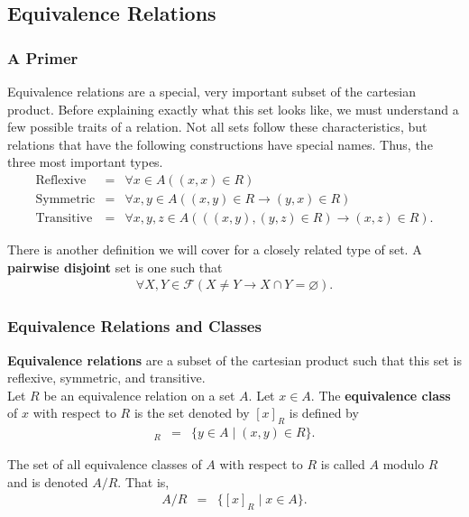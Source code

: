 \documentclass{article}
\begin{document}
\subsection{Equivalence Relations}
\subsubsection{A Primer}
Equivalence relations are a special, very important subset of the cartesian product. Before explaining exactly what this set looks like, we 
must understand a few possible traits of a relation. Not all sets follow these characteristics, but relations that have the following constructions
have special names. Thus, the three most important types.
\begin{eqnarray*}
    \text{Reflexive} &=& \forall x \in A ((x,x) \in R) \\
    \text{Symmetric} &=&  \forall x,y \in A((x,y) \in R \rightarrow (y,x) \in R) \\
    \text{Transitive} &=& \forall x,y,z \in A(((x,y), (y,z) \in R) \rightarrow (x,z) \in R).
\end{eqnarray*}

\noindent There is another definition we will cover for a closely related type of set. A \textbf{pairwise disjoint} set is one such that
\begin{eqnarray*}
    \forall X, Y \in \mathcal{F}(X \neq Y \rightarrow X \cap Y = \varnothing).
\end{eqnarray*}

\subsubsection{Equivalence Relations and Classes}
\textbf{Equivalence relations} are a subset of the cartesian product such that this set is reflexive, symmetric, and transitive. \\

\noindent Let $R$ be an equivalence relation on a set $A$. Let $x \in A$. The \textbf{equivalence class} of $x$ with respect to $R$ is the set
denoted by $[x]_R$ is defined by
\begin{eqnarray*}
    [x]_R &=& \{ y \in A \; | \; (x,y) \in R \}.
\end{eqnarray*}

\noindent The set of all equivalence classes of $A$ with respect to $R$ is called $A$ modulo $R$ and is denoted $A / R$. That is,
\begin{eqnarray*}
    A / R &=& \{ [x]_R \; | \; x \in A \}.
\end{eqnarray*}
\end{document}
